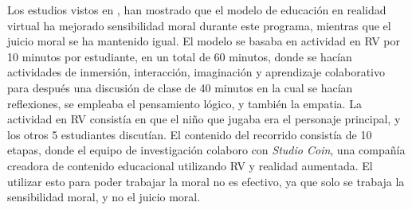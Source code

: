 Los estudios vistos en \cite{SHIM2023100010}, han mostrado que el modelo de educación en realidad virtual ha mejorado sensibilidad moral durante este programa, mientras que el juicio moral se ha mantenido igual. El modelo se basaba en actividad en RV por 10 minutos por estudiante, en un total de 60 minutos, donde se hacían actividades de inmersión, interacción, imaginación y aprendizaje colaborativo para después una discusión de clase de 40 minutos en la cual se hacían reflexiones, se empleaba el pensamiento lógico, y también la empatia. La actividad en RV consistía en que el niño que jugaba era el personaje principal, y los otros 5 estudiantes discutían. El contenido del recorrido consistía de 10 etapas, donde el equipo de investigación colaboro con \textit{Studio Coin}, una compañía creadora de contenido educacional utilizando RV y realidad aumentada. El utilizar esto para poder trabajar la moral no es efectivo, ya que solo se trabaja la sensibilidad moral, y no el juicio moral.


